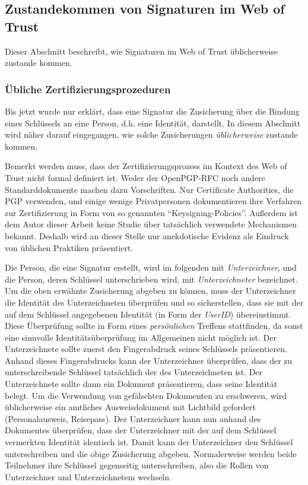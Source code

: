 \subsection{Zustandekommen von Signaturen im Web of Trust}
\label{sec:sozi-komp-des}
Dieser Abschnitt beschreibt, wie Signaturen im Web of Trust
\"ublicherweise zustande kommen.

\subsubsection{Übliche Zertifizierungsprozeduren}
\label{sec:ubliche-zert}

Bis jetzt wurde nur erklärt, dass eine Signatur die
Zusicherung über die Bindung eines Schlüssels an eine Person,
d.h. eine Identität, darstellt. In diesem Abschnitt wird näher
darauf eingegangen, wie solche Zusicherungen \emph{üblicherweise}
zustande kommen.

Bemerkt werden muss, dass der Zertifizierungsprozess im Kontext des
Web of Trust nicht formal definiert ist. Weder der OpenPGP-RFC noch
andere Standarddokumente machen dazu Vorschriften. Nur Certificate
Authorities, die PGP verwenden, und einige wenige Privatpersonen
dokumentieren ihre Verfahren zur Zertifizierung in Form von
so genannten ``Keysigning-Policies''. Außerdem ist dem Autor dieser
Arbeit keine Studie über tatsächlich verwendete Mechanismen
bekannt. Deshalb wird an dieser Stelle nur anekdotische Evidenz
als Eindruck von üblichen Praktiken präsentiert.

Die Person, die eine Signatur erstellt, wird im folgenden mit
\emph{Unterzeichner}, und die Person, deren Schlüssel
unterschrieben wird, mit \emph{Unterzeichneter} bezeichnet. Um
die oben erwähnte Zusicherung abgeben zu können, muss der
Unterzeichner die Identität des Unterzeichneten überprüfen und
so sicherstellen, dass sie mit der auf dem Schlüssel angegebenen
Identität (in Form der \emph{UserID}) übereinstimmt. Diese
Überprüfung sollte in Form eines \emph{persönlichen} Treffens
stattfinden, da sonst eine sinnvolle Identitätsüberprüfung im
Allgemeinen nicht möglich ist. Der Unterzeichnete sollte zuerst den
Fingerabdruck seines Schlüssels präsentieren. Anhand dieses
Fingerabdrucks kann der Unterzeichner überprüfen, dass der zu
unterschreibende Schlüssel tatsächlich der des Unterzeichneten
ist.  Der Unterzeichnete sollte dann ein Dokument präsentieren, dass
seine Identität belegt. Um die Verwendung von gefälschten
Dokumenten zu erschweren, wird üblicherweise ein amtliches
Ausweisdokument mit Lichtbild gefordert (Personalausweis,
Reisepass). Der Unterzeichner kann nun anhand des Dokumentes
überprüfen, dass der Unterzeichner mit der auf dem Schlüssel
vermerkten Identität identisch ist. Damit kann der Unterzeichner den
Schlüssel unterschreiben und die obige Zusicherung
abgeben. Normalerweise werden beide Teilnehmer ihre Schlüssel
gegenseitig unterschreiben, also die Rollen von Unterzeichner und
Unterzeichnetem wechseln.

